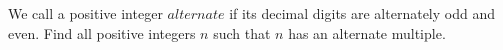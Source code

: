 We call a positive integer $alternate$ if its decimal digits are alternately odd and even. Find all positive integers $n$ such that $n$ has an alternate multiple.
